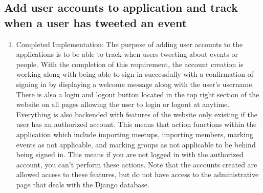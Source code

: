 \documentclass[draftclsnofoot,10pt,onecolumn]{IEEEtran} %
\begin{document}
\subsection{Add user accounts to application and track when a user has tweeted an event}
\begin{enumerate}[label*=\arabic*.]
  \item Completed Implementation: The purpose of adding user accounts to the applications
    is to be able to track when users tweeting about events or people. With the completion
    of this requirement, the account creation is working along with being able to sign in 
    successfully with a confirmation of signing in by displaying a welcome message along with
    the user's username. There is also a login and logout button located in the
    top right section of the website on all pages allowing the user to login or
    logout at anytime. Everything is also backended with features of the website only existing
    if the user has an authorized account. This means that action functions within the application
    which include importing meetups, importing members, marking events as not
    applicable, and marking groups as not applicable to be behind being signed in.
    This means if you are not logged in with the authorized account, you can't perform these 
    actions. Note that the accounts created are allowed access to these features, but do not
    have access to the administrative page that deals with the Django database.

\end{enumerate}
\end{document}
